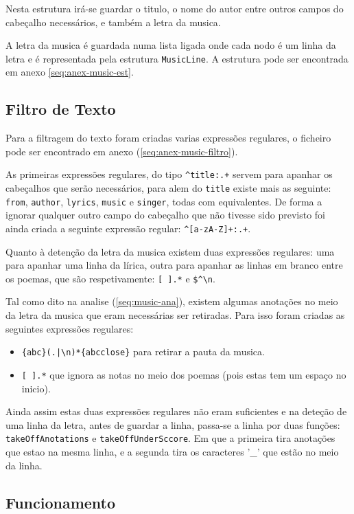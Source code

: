 Nesta estrutura irá-se guardar o titulo, o nome do autor entre outros campos do cabeçalho necessários, e também a letra da musica.

A letra da musica é guardada numa lista ligada onde cada nodo é um linha da letra e é representada pela estrutura \verb!MusicLine!.
A estrutura pode ser encontrada em anexo \ref{seq:anex-music-est}.

\subsection{Filtro de Texto}
\label{seq:music-filtro}
Para a filtragem do texto foram criadas varias expressões regulares, o ficheiro pode ser encontrado em anexo (\ref{seq:anex-music-filtro}).

As primeiras expressões regulares, do tipo \verb!^title:.+! servem para apanhar os cabeçalhos que serão necessários, para alem do \verb!title! existe mais as seguinte: \verb!from!, \verb!author!, \verb!lyrics!, \verb!music! e \verb!singer!, todas com equivalentes. 
De forma a ignorar qualquer outro campo do cabeçalho que não tivesse sido previsto foi ainda criada a seguinte expressão regular: \verb!^[a-zA-Z]+:.+!.

Quanto à detenção da letra da musica existem duas expressões regulares: uma para apanhar uma linha da lírica, outra para apanhar as linhas em branco entre os poemas, que são respetivamente: \verb![ ].*! e \verb!$^\n!.

Tal como dito na analise (\ref{seq:music-ana}), existem algumas anotações no meio da letra da musica que eram necessárias ser retiradas. Para isso foram criadas as seguintes expressões regulares:

\begin{itemize}
\item \verb!{abc}(.|\n)*{abcclose}! para retirar a pauta da musica.
\item \verb![ ].*! que ignora as notas no meio dos poemas (pois estas tem um espaço no inicio).
\end{itemize}

Ainda assim estas duas expressões regulares não eram suficientes e na deteção de uma linha da letra, antes de guardar a linha, passa-se a linha por duas funções: \verb!takeOffAnotations! e \verb!takeOffUnderSccore!. Em que a primeira tira anotações que estao na mesma linha, e a segunda tira os caracteres '\_'  que estão no meio da linha.

\subsection{Funcionamento}
\label{seq:music-func}

